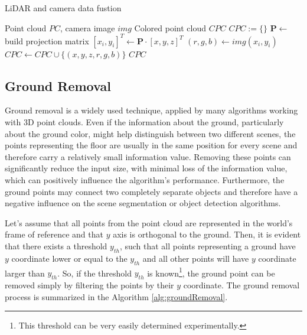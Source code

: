 \begin{algorithm}
    \caption{LiDAR and camera data fustion}\label{alg:fusion}
    \begin{algorithmic}
        \Require Point cloud $PC$, camera image $img$
        \Ensure Colored point cloud $CPC$
        \State $CPC := \{\}$  
        \State $\mathbf{P} \leftarrow $ build projection matrix
         
        \State $[x_i,y_i]^T \leftarrow  \mathbf{P}\cdot[x,y,z]^T$ 
         
        \State $(r,g,b) \leftarrow  img(x_i,y_i)$  
        \State $CPC \leftarrow CPC \cup \{(x,y,z,r,g,b)\}$  
        \EndIf
        \EndFor
        \State\Return $CPC$
    \end{algorithmic}
\end{algorithm}

\subsection{Ground Removal}

Ground removal is a widely used technique, applied by many algorithms working with 3D point clouds. Even if the information about the ground, particularly about the ground color, might help distinguish between two different scenes, the points representing the floor are usually in the same position for every scene and therefore carry a relatively small information value. Removing these points can significantly reduce the input size, with minimal loss of the information value, which can positively influence the algorithm's performance. Furthermore, the ground points may connect two completely separate objects and therefore have a negative influence on the scene segmentation or object detection algorithms.\par
Let's assume that all points from the point cloud are represented in the world's frame of reference and that $y$ axis is orthogonal to the ground. Then, it is evident that there exists a threshold $y_{th}$, such that all points representing a ground have $y$ coordinate lower or equal to the $y_{th}$ and all other points will have $y$ coordinate larger than $y_{th}$. So, if the threshold $y_{th}$ is known\footnote{This threshold can be very easily determined experimentally.}, the ground point can be removed simply by filtering the points by their $y$ coordinate. The ground removal process is summarized in the Algorithm \ref{alg:groundRemoval}.

